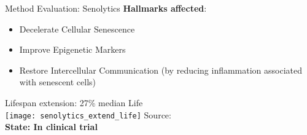 % 
% 
% 


\begin{frame}[c]{Method Evaluation: Senolytics}
    \textbf{Hallmarks affected}: \\
    \begin{itemize}[<+(1)->]
        \item Decelerate Cellular Senescence
        \item Improve Epigenetic Markers
        \item Restore Intercellular Communication (by reducing inflammation associated with senescent cells)
    \end{itemize}
    \pause
    Lifespan extension: 27\% median Life\\
    \texttt{[image: senolytics\_extend\_life]}
    Source: \cite{baker2016naturally} \\
    \pause
    \textbf{State: In clinical trial}
\end{frame}


